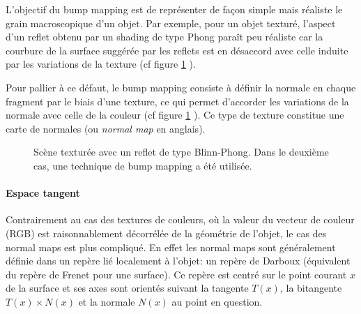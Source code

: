 \documentclass{article}
\begin{document}
L'objectif du bump mapping est de représenter de façon simple mais réaliste le grain macroscopique d'un objet. Par exemple, pour un objet texturé, l'aspect d'un reflet obtenu par un shading de type Phong paraît peu réaliste car la courbure de la surface suggérée par les reflets est en désaccord avec celle induite par les variations de la texture (cf figure \ref{fig:bm} ).

Pour pallier à ce défaut, le bump mapping consiste à définir la normale en chaque fragment par le biais d'une texture, ce qui permet d'accorder les variations de la normale avec celle de la couleur (cf figure \ref{fig:bm} ). Ce type de texture constitue une carte de normales (ou \emph{normal map} en anglais).

\begin{figure}
\caption{Scène texturée avec un reflet de type Blinn-Phong. Dans le deuxième cas, une technique de bump mapping a été utilisée.}
\label{fig:bm}
\end{figure}

\paragraph{Espace tangent}
Contrairement au cas des textures de couleurs, où la valeur du vecteur de couleur (RGB) est raisonnablement décorrélée de la géométrie de l'objet, le cas des normal maps est plus compliqué. En effet les normal maps sont généralement définie dans un repère lié localement à l'objet: un repère de Darboux (équivalent du repère de Frenet pour une surface). Ce repère est centré sur le point courant $x$ de la surface et ses axes sont orientés suivant la tangente $T(x)$, la bitangente $T(x)\times N(x)$ et la normale $N(x)$ au point en question.
\end{document}
